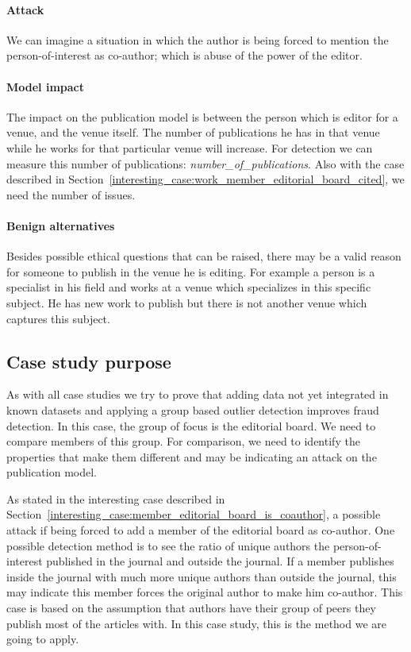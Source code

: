 \documentclass{ou-report}
\begin{document}
\paragraph{Attack}
We can imagine a situation in which the author is being forced to mention the 
person-of-interest as co-author; which is abuse of the power of the editor.

\paragraph{Model impact}
The impact on the publication model is between the person which is 
\mbox{editor} for a 
venue, and the venue itself. 
The number of publications he has in that venue while he works for that 
particular venue 
will increase. For detection we can measure this number of publications:
\textit{number\_of\_publications}. Also with the 
case described in 
Section~\ref{interesting_case:work_member_editorial_board_cited}, we need the 
number of issues.

\paragraph{Benign alternatives}
Besides possible ethical questions that can be raised, there may be a valid
reason for someone to publish in the venue he is editing. For example a person
is a 
specialist in his field and works at a venue which specializes in this 
specific subject. He has new work to publish but there is not another venue 
which captures this subject.

\subsection{Case study purpose}
\label{subsec:case2_purpose}
As with all case studies we try to prove that adding data not yet integrated in
known datasets and applying a group based outlier detection improves fraud
detection. In this case, the group of focus is the editorial board.
We need to compare members of this group. For comparison, we need to identify
the properties that make them different and may be indicating an attack on the
publication model.

As stated in the interesting case described in 
Section~\ref{interesting_case:member_editorial_board_is_coauthor}, a possible
attack if being forced to add a member of the editorial board as co-author. One
possible detection method is to see the ratio of unique authors the
person-of-interest published in the journal and outside the journal. If a member
publishes inside the journal with much more unique authors than outside the
journal, this may indicate this member forces the original author to make him
co-author. This case is based on the assumption that authors have their group of
peers they publish most of the articles with. In this case study, this is the
method we are going to apply.
\end{document}
